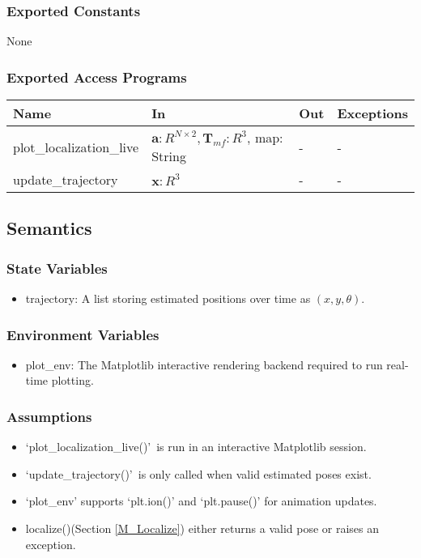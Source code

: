 \documentclass[12pt, titlepage]{article}
\begin{document}
\subsubsection{Exported Constants}
None

\subsubsection{Exported Access Programs}

\begin{center}
\begin{tabular}{p{4cm} p{6cm} p{4cm} p{2cm}}
\hline
\textbf{Name} & \textbf{In} & \textbf{Out} & \textbf{Exceptions} \\
\hline
plot\_localization\_live & $\mathbf{a}: R^{N \times 2}, \mathbf{T}_{mf}: R^3$, map: String  & - & - \\
\hline
update\_trajectory &  $\hat{\mathbf{x}}: R^3$ & - & - \\
\hline
\end{tabular}
\end{center}

\subsection{Semantics}

\subsubsection{State Variables}
\begin{itemize}
  \item trajectory: A list storing estimated positions over time as $(x, y, \theta)$.
\end{itemize}

\subsubsection{Environment Variables}
\begin{itemize}
  \item plot\_env: The Matplotlib interactive rendering backend required to run real-time plotting.
\end{itemize}

\subsubsection{Assumptions}
\begin{itemize}
  \item \lq plot\_localization\_live()\rq~is run in an interactive Matplotlib session.
  \item \lq update\_trajectory()\rq~is only called when valid estimated poses exist.
  \item `plot\_env' supports `plt.ion()' and `plt.pause()' for animation updates.
  \item localize()(Section \ref{M_Localize}) either returns a valid pose or raises an exception.
\end{itemize}
\end{document}
